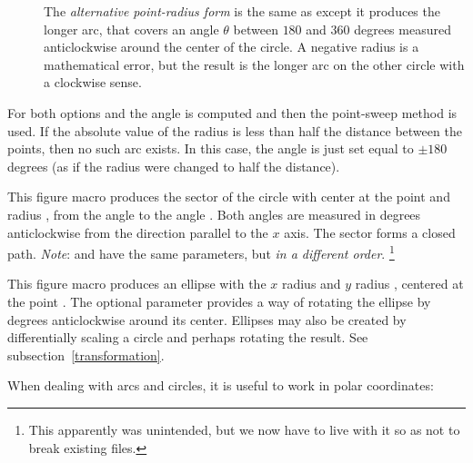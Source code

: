 \documentclass[letterpaper]{article}
\begin{document}
\begin{description}
\item[] The \textit{alternative point-radius form} is the same as
 except it produces the longer arc, that covers an angle
$\theta$ between $180$ and $360$ degrees measured anticlockwise around
the center of the circle. A negative radius is a mathematical error, but
the result is the longer arc on the other circle with a clockwise sense.
\end{description}

For both options  and  the angle is computed and then
the point-sweep method is used. If the absolute value of the radius is
less than half the distance between the points, then no such arc exists.
In this case, the angle is just set equal to $\pm180$ degrees (as if the
radius were changed to half the distance).

\begin{cd}
%
%
\end{cd}

This figure macro produces the sector of the circle with center at the
point  and radius , from the angle 
to the angle . Both angles are measured in degrees
anticlockwise from the direction parallel to the $x$ axis. The sector
forms a closed path. \emph{Note}:  and  have
the same parameters, but \emph{in a different order}.%
    \footnote{This apparently was unintended, but we now have to live
    with it so as not to break existing  files.}


\begin{cd}
\oarg{\meta{$\theta$}}%
%
\end{cd}

This figure macro produces an ellipse with the $x$ radius 
and $y$ radius , centered at the point . The
optional parameter \meta{$\theta$} provides a way of rotating the
ellipse by \meta{$\theta$} degrees anticlockwise around its center.
Ellipses may also be created by differentially scaling a circle and
perhaps rotating the result. See subsection~\ref{transformation}.


When dealing with arcs and circles, it is useful to work in polar
coordinates:

\begin{cd}
%
%
\end{cd}
\end{document}
